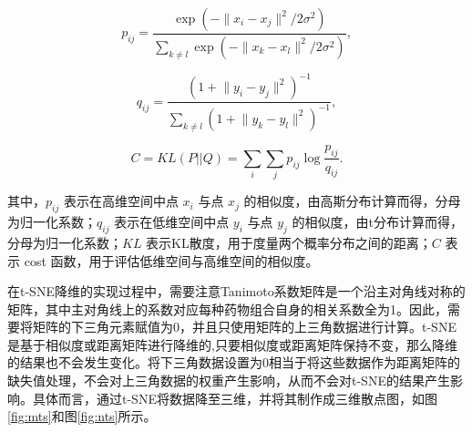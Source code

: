 \begin{equation}
p_{ij} = \frac{\exp(-\lVert x_i - x_j \rVert^2 / 2\sigma^2)}{\sum_{k \neq l} \exp(-\lVert x_k - x_l \rVert^2 / 2\sigma^2)},\label{eq:t1}
\end{equation}

\begin{equation}
q_{ij} = \frac{(1 + \lVert y_i - y_j \rVert^2)^{-1}}{\sum_{k \neq l} (1 + \lVert y_k - y_l \rVert^2)^{-1}},\label{eq:t2}
\end{equation}

\begin{equation}
C = KL(P || Q) = \sum_i \sum_j p_{ij} \log \frac{p_{ij}}{q_{ij}}.\label{eq:t3}
\end{equation}

\noindent 其中，$p_{ij}$ 表示在高维空间中点 $x_i$ 与点 $x_j$ 的相似度，由高斯分布计算而得，分母为归一化系数；$q_{ij}$ 表示在低维空间中点 $y_i$ 与点 $y_j$ 的相似度，由t分布计算而得，分母为归一化系数；$KL$ 表示KL散度，用于度量两个概率分布之间的距离；$C$ 表示 cost 函数，用于评估低维空间与高维空间的相似度。

在t-SNE降维的实现过程中，需要注意Tanimoto系数矩阵是一个沿主对角线对称的矩阵，其中主对角线上的系数对应每种药物组合自身的相关系数全为1。因此，需要将矩阵的下三角元素赋值为0，并且只使用矩阵的上三角数据进行计算。t-SNE是基于相似度或距离矩阵进行降维的,只要相似度或距离矩阵保持不变，那么降维的结果也不会发生变化。将下三角数据设置为0相当于将这些数据作为距离矩阵的缺失值处理，不会对上三角数据的权重产生影响，从而不会对t-SNE的结果产生影响。具体而言，通过t-SNE将数据降至三维，并将其制作成三维散点图，如图\ref{fig:mts}和图\ref{fig:nts}所示。

